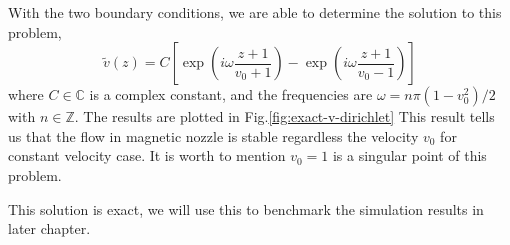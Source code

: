 With the two boundary conditions, we are able to determine the solution to this problem,
\begin{equation} \label{eq:constant-v-solution-dirichlet}
	\tilde{v}(z) = C\left[ \exp\left(i\omega\frac{z+1}{v_0+1}\right) - \exp\left(i\omega\frac{z+1}{v_0-1}\right) \right]
\end{equation}
where $C\in\mathbb{C}$ is a complex constant, and the frequencies are $\omega=n\pi(1-v_0^2)/2$ with $n\in\mathbb{Z}$. The results are plotted in Fig.\ref{fig:exact-v-dirichlet} This result tells us that the flow in magnetic nozzle is stable regardless the velocity $v_0$ for constant velocity case. It is worth to mention $v_0=1$ is a singular point of this problem.

This solution is exact, we will use this to benchmark the simulation results in later chapter.

